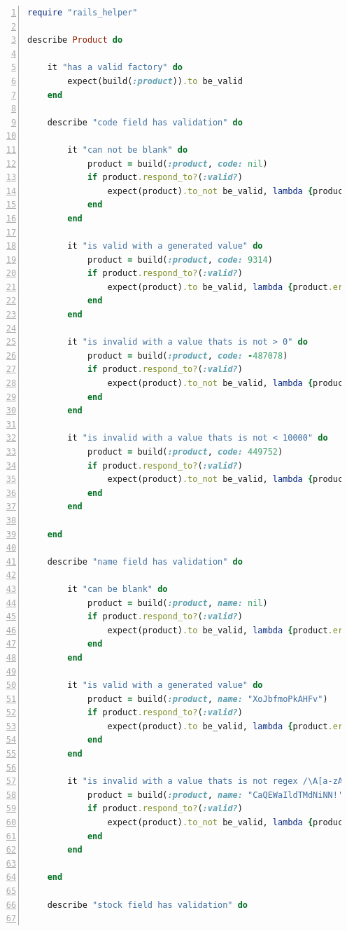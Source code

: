 \documentclass[a4paper,12pt]{article}
\begin{document}
\begin{lstlisting}[frame=single,numbers=left,language = ruby,caption= {Test suite output for Product defined in chapter 6}, label={code:nice}]
require "rails_helper"

describe Product do

	it "has a valid factory" do
		expect(build(:product)).to be_valid
	end

	describe "code field has validation" do

		it "can not be blank" do 
			product = build(:product, code: nil)
			if product.respond_to?(:valid?)
				expect(product).to_not be_valid, lambda {product.errors.full_messages.join("\n")}
			end
		end

		it "is valid with a generated value" do
			product = build(:product, code: 9314)
			if product.respond_to?(:valid?)
				expect(product).to be_valid, lambda {product.errors.full_messages.join("\n")}
			end
		end

		it "is invalid with a value thats is not > 0" do
			product = build(:product, code: -487078)
			if product.respond_to?(:valid?)
				expect(product).to_not be_valid, lambda {product.errors.full_messages.join("\n")}
			end
		end

		it "is invalid with a value thats is not < 10000" do
			product = build(:product, code: 449752)
			if product.respond_to?(:valid?)
				expect(product).to_not be_valid, lambda {product.errors.full_messages.join("\n")}
			end
		end

	end

	describe "name field has validation" do

		it "can be blank" do 
			product = build(:product, name: nil)
			if product.respond_to?(:valid?)
				expect(product).to be_valid, lambda {product.errors.full_messages.join("\n")}
			end
		end

		it "is valid with a generated value" do
			product = build(:product, name: "XoJbfmoPkAHFv")
			if product.respond_to?(:valid?)
				expect(product).to be_valid, lambda {product.errors.full_messages.join("\n")}
			end
		end

		it "is invalid with a value thats is not regex /\A[a-zA-Z]+\z/" do
			product = build(:product, name: "CaQEWaIldTMdNiNN!'}??-@)&\"(-'*:]!'(FnahDn8DrLNY6_5u04e0jrEPQJmWX")
			if product.respond_to?(:valid?)
				expect(product).to_not be_valid, lambda {product.errors.full_messages.join("\n")}
			end
		end

	end

	describe "stock field has validation" do


\end{lstlisting}
\end{document}
